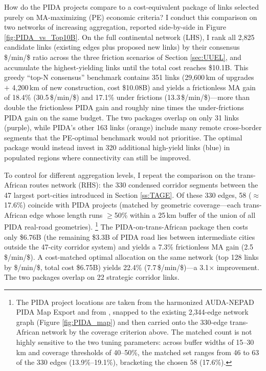 \documentclass[a4paper]{article}
\begin{document}
How do the PIDA projects compare to a cost-equivalent package of links selected purely on MA-maximizing (PE) economic criteria? I conduct this comparison on two networks of increasing aggregation, reported side-by-side in Figure \ref{fig:PIDA_vs_Top10B}. On the full continental network (LHS), I rank all 2,825 candidate links (existing edges plus proposed new links) by their consensus \$/min/\$ ratio across the three friction scenarios of Section \ref{sec:UUEL}, and accumulate the highest-yielding links until the total cost reaches \$10.1B. This greedy ``top-N consensus'' benchmark contains 351 links (29,600\,km of upgrades $+$ 4,200\,km of new construction, cost \$10.08B) and yields a frictionless MA gain of 18.4\% (30.5\,\$/min/\$) and 17.1\% under frictions (13.3\,\$/min/\$)---more than double the frictionless PIDA gain and roughly nine times the under-frictions PIDA gain on the same budget. The two packages overlap on only 31 links (purple), while PIDA's other 163 links (orange) include many remote cross-border segments that the PE-optimal benchmark would not prioritise. The optimal package would instead invest in 320 additional high-yield links (blue) in populated regions where connectivity can still be improved. \newline

To control for different aggregation levels, I repeat the comparison on the trans-African routes network (RHS): the 330 condensed corridor segments between the 47 largest port-cities introduced in Section \ref{ss:TAGE}. Of these 330 edges, 58 ($\approx$17.6\%) coincide with PIDA projects (matched by geometric coverage---each trans-African edge whose length runs $\geq$50\% within a 25\,km buffer of the union of all PIDA real-road geometries).%
\footnote{The PIDA project locations are taken from the harmonized AUDA-NEPAD PIDA Map Export \citep{audanepad_aid_2026, auda_nepad_pida_2023} and from \citet{fontagne2023trade}, snapped to the existing 2,344-edge network graph (Figure \ref{fig:PIDA_map}) and then carried onto the 330-edge trans-African network by the coverage criterion above. %
The matched count is not highly sensitive to the two tuning parameters: across buffer widths of 15--30\,km and coverage thresholds of 40--50\%, the matched set ranges from 46 to 63 of the 330 edges (13.9\%--19.1\%), bracketing the chosen 58 (17.6\%). %
} The PIDA-on-trans-African package then costs only \$6.76B (the remaining \$3.3B of PIDA road lies between intermediate cities outside the 47-city corridor system) and yields a 7.3\% frictionless MA gain (2.5\,\$/min/\$). A cost-matched optimal allocation on the same network (top 128 links by \$/min/\$, total cost \$6.75B) yields 22.4\% (7.7\,\$/min/\$)---a 3.1$\times$ improvement. The two packages overlap on 22 strategic corridor links. \newline 
\end{document}
